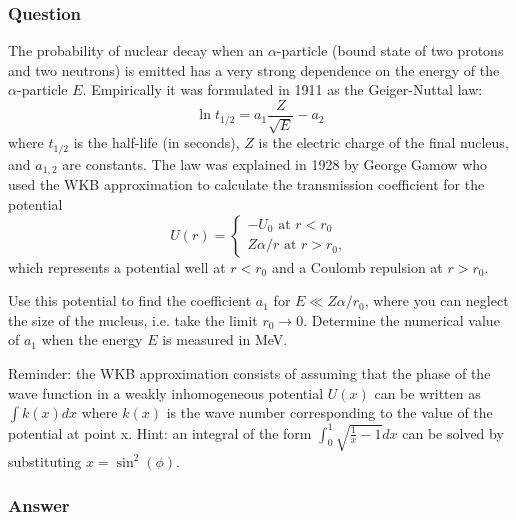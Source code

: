 \subsubsection{Question}
The probability of nuclear decay when an ${\alpha}$-particle (bound state of two protons and two neutrons) is emitted has a very strong dependence on the energy of the ${\alpha}$-particle $E$. Empirically it was formulated in 1911 as the Geiger-Nuttal law:
\begin{equation*}
	\ln t_{1/2} = a_1\frac{Z}{\sqrt{E}} - a_2
\end{equation*}
where $t_{1/2}$ is the half-life (in seconds), $Z$ is the electric charge of the final nucleus, and $a_{1,2}$ are constants. The law was explained in 1928 by George Gamow who used the WKB approximation to calculate the transmission coefficient for the potential
\begin{equation*}
	U(r) = \begin{cases}
		-U_0 \text{ at } r< r_0\\
		Z\alpha/r \text{ at } r>r_0,
	\end{cases}
\end{equation*}
which represents a potential well at $r < r_0$ and a Coulomb repulsion at $r > r_0$.

Use this potential to find the coefficient $a_1$ for $E\ll Z{\alpha}/r_0$, where you can neglect the size of the nucleus, i.e. take the limit $r_0 \to 0$. Determine the numerical value of $a_1$ when the energy $E$ is measured in MeV.

Reminder: the WKB approximation consists of assuming that the phase of the wave function in a weakly inhomogeneous potential $U(x)$ can be written as $\int k(x) dx$ where $k(x)$ is the wave number corresponding to the value of the potential at point x. Hint: an integral of the form $\int_0^1\sqrt{\frac{1}{x}-1} dx$ can be solved by substituting $x =\sin^2(\phi)$.
\subsubsection{Answer}


